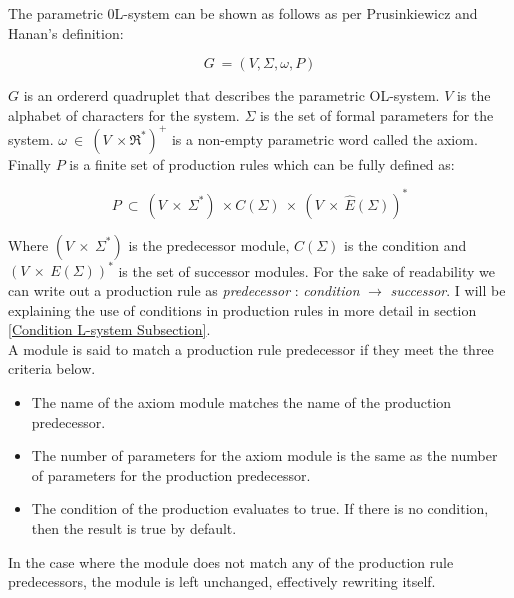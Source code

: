 \begin{flushleft}
The parametric 0L-system can be shown as follows as per Prusinkiewicz and Hanan's definition:\\

\vspace{5mm}

\begin{equation}
G~ = (V, \Sigma, \omega, P)
\end{equation}
\vspace{5mm}

$G$ is an ordererd quadruplet that describes the parametric OL-system. $V$ is the alphabet of characters for the system. $\Sigma$ is the set of formal parameters for the system. $\omega~ \in~ (V~ \times \Re^*)^+$ is a non-empty parametric word called the axiom. Finally $P$ is a finite set of production rules which can be fully defined as:

\vspace{5mm}

\begin{equation}
P~ \subset~ (V~ \times~ \Sigma^*)~ \times C(\Sigma)~ \times~ (V~ \times~ \hat{E}(\Sigma))^*
\end{equation}

\vspace{5mm} 

Where $(V~ \times~ \Sigma^*) $ is the predecessor module, $C(\Sigma) $ is the condition and $(V~ \times~ E(\Sigma))^* $ is the set of successor modules. For the sake of readability we can write out a production rule as \textit{predecessor} : \textit{condition} $\rightarrow$ \textit{successor}. I will be explaining the use of conditions in production rules in more detail in section \ref{Condition L-system Subsection}.\\
A module is said to match a production rule predecessor if they meet the three criteria below.

\vspace{5mm}

\begin{itemize}
\item The name of the axiom module matches the name of the production predecessor.
\item The number of parameters for the axiom module is the same as the number of parameters for the production predecessor.
\item The condition of the production evaluates to true. If there is no condition, then the result is true by default.
\end{itemize}

\vspace{5mm}

In the case where the module does not match any of the production rule predecessors, the module is left unchanged, effectively rewriting itself. \\

\end{flushleft}

